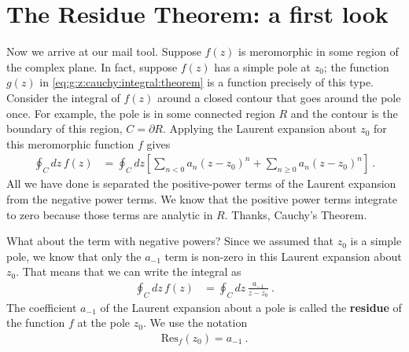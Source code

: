 \section{The Residue Theorem: a first look}

Now we arrive at our mail tool. Suppose $f(z)$ is meromorphic in some region of the complex plane. In fact, suppose $f(z)$ has a simple pole at $z_0$; the function $g(z)$ in \eqref{eq:g:z:cauchy:integral:theorem} is a function precisely of this type. Consider the integral of $f(z)$ around a closed contour that goes around the pole once. For example, the pole is in some connected region $R$ and the contour is the boundary of this region, $C=\partial R$. Applying the Laurent expansion about $z_0$ for this meromorphic function $f$ gives
\begin{align}
  \oint_C dz\, f(z) &= \oint_C dz 
  \left[
  \sum_{n<0} a_n (z-z_0)^n + \sum_{n\geq 0} a_n (z-z_0)^n
  \right] \ .
\end{align}
All we have done is separated the positive-power terms of the Laurent expansion from the negative power terms. We know that the positive power terms integrate to zero because those terms are analytic in $R$. Thanks, Cauchy's Theorem.

What about the term with negative powers? Since we assumed that $z_0$ is a simple pole, we know that only the $a_{-1}$ term is non-zero in this Laurent expansion about $z_0$. That means that we can write the integral as
\begin{align}
  \oint_C dz\, f(z) &= 
  \oint_C dz \,
  \frac{a_{-1}}{z-z_0} 
  \ .
  \label{eq:residue:int:step:1}
\end{align}
The coefficient $a_{-1}$ of the Laurent expansion about a pole is called the \textbf{residue} of the function $f$ at the pole $z_0$. We use the notation 
\begin{align}
\text{Res}_f(z_0) = a_{-1} \ .
\end{align}
 


